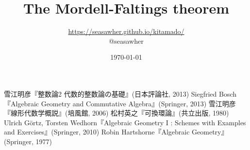 \documentclass[10pt]{jsarticle}
\begin{document}
\title{The Mordell-Faltings theorem}
\author{\url{https://seasawher.github.io/kitamado/} \\ @seasawher}
\date{\today}
\maketitle



\newpage



\begin{thebibliography}{1}
 雪江明彦『整数論2 代数的整数論の基礎』(日本評論社, 2013)
 Siegfried Bosch『Algebraic Geometry and Commutative Algebra』(Springer, 2013)
 雪江明彦『線形代数学概説』(培風館, 2006)
   松村英之『可換環論』(共立出版, 1980)
   Ulrich G\"{o}rtz, Torsten Wedhorn『Algebraic Geometry I : Schemes  with Examples and Exercises』(Springer, 2010)
   Robin Hartshorne『Algebraic Geometry』(Springer, 1977)
\end{thebibliography}
\end{document}
